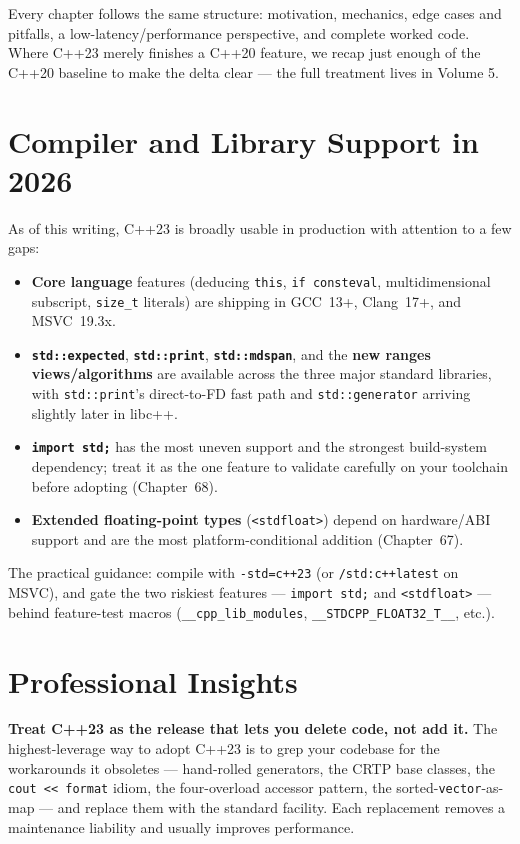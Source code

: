 Every chapter follows the same structure: motivation, mechanics, edge cases and pitfalls, a low-latency/performance perspective, and complete worked code. Where C++23 merely finishes a C++20 feature, we recap just enough of the C++20 baseline to make the delta clear --- the full treatment lives in Volume 5.

\section{Compiler and Library Support in 2026}

As of this writing, C++23 is broadly usable in production with attention to a few gaps:

\begin{itemize}
    \item \textbf{Core language} features (deducing \lstinline|this|, \lstinline|if consteval|, multidimensional subscript, \lstinline|size_t| literals) are shipping in GCC~13+, Clang~17+, and MSVC~19.3x.
    \item \textbf{\lstinline|std::expected|}, \textbf{\lstinline|std::print|}, \textbf{\lstinline|std::mdspan|}, and the \textbf{new ranges views/algorithms} are available across the three major standard libraries, with \lstinline|std::print|'s direct-to-FD fast path and \lstinline|std::generator| arriving slightly later in libc++.
    \item \textbf{\lstinline|import std;|} has the most uneven support and the strongest build-system dependency; treat it as the one feature to validate carefully on your toolchain before adopting (Chapter~68).
    \item \textbf{Extended floating-point types} (\lstinline|<stdfloat>|) depend on hardware/ABI support and are the most platform-conditional addition (Chapter~67).
\end{itemize}

The practical guidance: compile with \lstinline|-std=c++23| (or \lstinline|/std:c++latest| on MSVC), and gate the two riskiest features --- \lstinline|import std;| and \lstinline|<stdfloat>| --- behind feature-test macros (\lstinline|__cpp_lib_modules|, \lstinline|__STDCPP_FLOAT32_T__|, etc.).

\section{Professional Insights}

\textbf{Treat C++23 as the release that lets you delete code, not add it.} The highest-leverage way to adopt C++23 is to grep your codebase for the workarounds it obsoletes --- hand-rolled generators, the CRTP base classes, the \lstinline|cout << format| idiom, the four-overload accessor pattern, the sorted-\lstinline|vector|-as-map --- and replace them with the standard facility. Each replacement removes a maintenance liability and usually improves performance.

